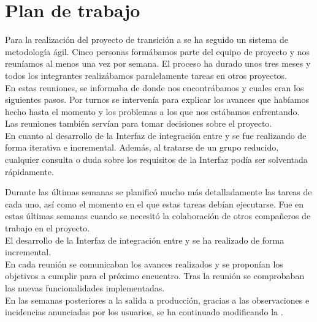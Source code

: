 \section{Plan de trabajo}

Para la realización del proyecto de transición a \wday{} se ha seguido un sistema de metodología ágil. 
Cinco personas formábamos parte del equipo de proyecto y nos reuníamos al menos una vez por semana.
El proceso ha durado unos tres meses y todos los integrantes realizábamos paralelamente tareas en otros proyectos.\\

En estas reuniones, se informaba de donde nos encontrábamos y cuales eran los siguientes pasos.
Por turnos se intervenía para explicar los avances que habíamos hecho hasta el momento y los problemas a los que nos estábamos enfrentando.
Las reuniones también servían para tomar decisiones sobre el proyecto.\\

En cuanto al desarrollo de la Interfaz de integración entre \hs{} y \wday{} se fue realizando de forma iterativa e incremental. 
Además, al tratarse de un grupo reducido, cualquier consulta o duda sobre los requisitos de la Interfaz podía ser solventada rápidamente.

Durante las últimas semanas se planificó mucho más detalladamente las tareas de cada uno, así como el momento en el que estas tareas debían ejecutarse.
Fue en estas últimas semanas cuando se necesitó la colaboración de otros compañeros de trabajo en el proyecto.\\

El desarrollo de la Interfaz de integración entre \hs{} y \wday{} se ha realizado de forma incremental.\\

En cada reunión se comunicaban los avances realizados y se proponían los objetivos a cumplir para el próximo encuentro. Tras la reunión se comprobaban las nuevas funcionalidades implementadas.\\

En las semanas posteriores a la salida a producción, gracias a las observaciones e incidencias anunciadas por los usuarios,
se ha continuado modificando la \iface{}. 
